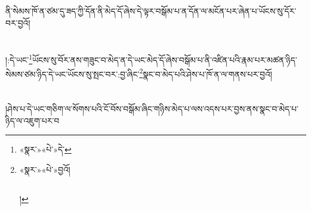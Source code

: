 ནི་སེམས་ཁོ་ན་ཙམ་དུ་ཟད་ཀྱི་དོན་ནི་མེད་དོ་ཞེས་དེ་ལྟར་བསྒོམ་པ་ན་དོན་ལ་མངོན་པར་ཞེན་པ་ཡོངས་སུ་དོར་བར་བྱའོ།\chapter{ }།:དེ་ཡང་\footnote{«སྣར་»«པེ་»དེ་}ཡོངས་སུ་བོར་ནས་གཟུང་བ་མེད་ན་དེ་ཡང་མེད་དོ་ཞེས་བསྒོམ་པ་ནི་འཛིན་པའི་རྣམ་པར་མཚན་ཉིད་སེམས་ཙམ་ཉིད་དེ་ཡང་ཡོངས་སུ་སྤང་བར་:བྱ་ཞིང་\footnote{«སྣར་»«པེ་»བྱའོ།\chapter{ }།}སྣང་བ་མེད་པའི་ཤེས་པ་ཁོ་ན་ལ་གནས་པར་བྱའོ།\chapter{ }།ཤེས་པ་དེ་ཡང་གཅིག་ལ་སོགས་པའི་ངོ་བོས་བསྒོམ་ཞིང་གཉིས་མེད་པ་ལས་འདས་པར་བྱས་ནས་སྣང་བ་མེད་པ་ཉིད་ལ་འཇུག་པར་བ